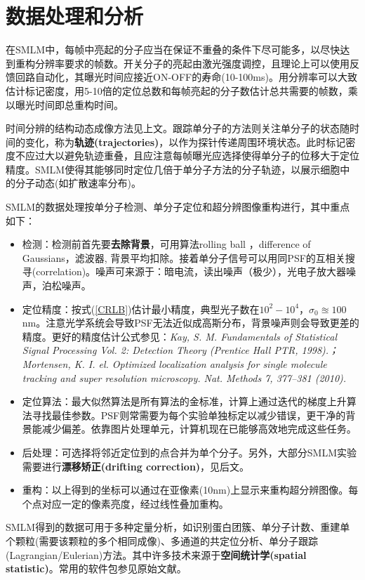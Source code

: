 \documentclass[12pt]{ctexart}%
\begin{document}
\section*{数据处理和分析}
在SMLM中，每帧中亮起的分子应当在保证不重叠的条件下尽可能多，以尽快达到重构分辨率要求的帧数。开关分子的亮起由激光强度调控，且理论上可以使用反馈回路自动化，其曝光时间应接近ON-OFF的寿命(10-100ms)。用分辨率可以大致估计标记密度，用5-10倍的定位总数和每帧亮起的分子数估计总共需要的帧数，乘以曝光时间即总重构时间。
\par 时间分辨的结构动态成像方法见上文。跟踪单分子的方法则关注单分子的状态随时间的变化，称为\textbf{轨迹(trajectories)}，以作为探针传递周围环境状态。此时标记密度不应过大以避免轨迹重叠，且应注意每帧曝光应选择使得单分子的位移大于定位精度。SMLM使得其能够同时定位几倍于单分子方法的分子轨迹，以展示细胞中的分子动态(如扩散速率分布)。
\par SMLM的数据处理按单分子检测、单分子定位和超分辨图像重构进行，其中重点如下：
\begin{itemize}
    \item 检测：检测前首先要\textbf{去除背景}，可用算法rolling ball ，difference of Gaussians，滤波器, 背景平均扣除。接着单分子信号可以用同PSF的互相关搜寻(correlation)。噪声可来源于：暗电流，读出噪声（极少），光电子放大器噪声，泊松噪声。
    \item 定位精度：按式(\ref{CRLB})估计最小精度，典型光子数在$10^2-10^4$，$\sigma_0\approxeq100$nm。注意光学系统会导致PSF无法近似成高斯分布，背景噪声则会导致更差的精度。更好的精度估计公式参见：\textit{Kay, S. M. Fundamentals of Statistical Signal Processing Vol. 2: Detection Theory (Prentice Hall PTR, 1998).；Mortensen, K. I. el. Optimized localization analysis for single molecule tracking and super resolution microscopy. Nat. Methods 7, 377–381 (2010).}
    \item 定位算法：最大似然算法是所有算法的金标准，计算上通过迭代的梯度上升算法寻找最佳参数。PSF则常需要为每个实验单独标定以减少错误，更干净的背景能减少偏差。依靠图片处理单元，计算机现在已能够高效地完成这些任务。
    \item 后处理：可选择将邻近定位到的点合并为单个分子。另外，大部分SMLM实验需要进行\textbf{漂移矫正(drifting correction)}，见后文。
    \item 重构：以上得到的坐标可以通过在亚像素(10nm)上显示来重构超分辨图像。每个点对应一定的像素亮度，经过线性叠加重构。
\end{itemize}
\par SMLM得到的数据可用于多种定量分析，如识别蛋白团簇、单分子计数、重建单个颗粒(需要该颗粒的多个相同成像)、多通道的共定位分析、单分子跟踪(Lagrangian/Eulerian)方法。其中许多技术来源于\textbf{空间统计学(spatial statistic)}。常用的软件包参见原始文献。
\end{document}
